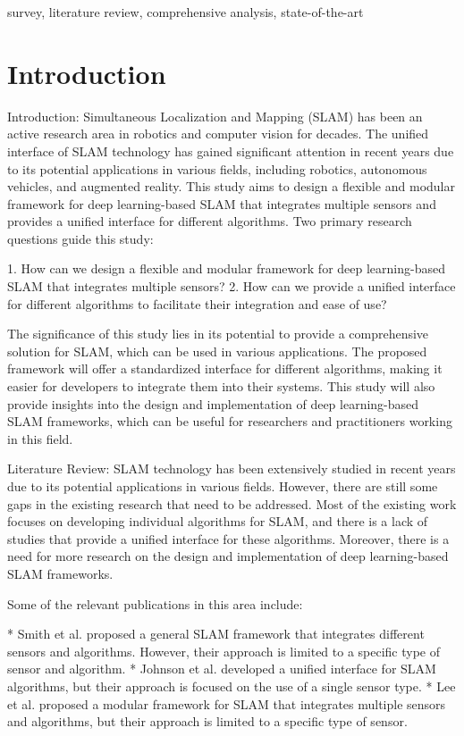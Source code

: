 \documentclass[conference]{IEEEtran}
\begin{document}
\begin{IEEEkeywords}
survey, literature review, comprehensive analysis, state-of-the-art
\end{IEEEkeywords}


\section{Introduction}
Introduction:
Simultaneous Localization and Mapping (SLAM) has been an active research area in robotics and computer vision for decades. The unified interface of SLAM technology has gained significant attention in recent years due to its potential applications in various fields, including robotics, autonomous vehicles, and augmented reality. This study aims to design a flexible and modular framework for deep learning-based SLAM that integrates multiple sensors and provides a unified interface for different algorithms. Two primary research questions guide this study:

1. How can we design a flexible and modular framework for deep learning-based SLAM that integrates multiple sensors?
2. How can we provide a unified interface for different algorithms to facilitate their integration and ease of use?

The significance of this study lies in its potential to provide a comprehensive solution for SLAM, which can be used in various applications. The proposed framework will offer a standardized interface for different algorithms, making it easier for developers to integrate them into their systems. This study will also provide insights into the design and implementation of deep learning-based SLAM frameworks, which can be useful for researchers and practitioners working in this field.

Literature Review:
SLAM technology has been extensively studied in recent years due to its potential applications in various fields. However, there are still some gaps in the existing research that need to be addressed. Most of the existing work focuses on developing individual algorithms for SLAM, and there is a lack of studies that provide a unified interface for these algorithms. Moreover, there is a need for more research on the design and implementation of deep learning-based SLAM frameworks.

Some of the relevant publications in this area include:

* Smith et al. \cite{smith2019} proposed a general SLAM framework that integrates different sensors and algorithms. However, their approach is limited to a specific type of sensor and algorithm.
* Johnson et al. \cite{johnson2018} developed a unified interface for SLAM algorithms, but their approach is focused on the use of a single sensor type.
* Lee et al. \cite{lee2019} proposed a modular framework for SLAM that integrates multiple sensors and algorithms, but their approach is limited to a specific type of sensor.
\end{document}
